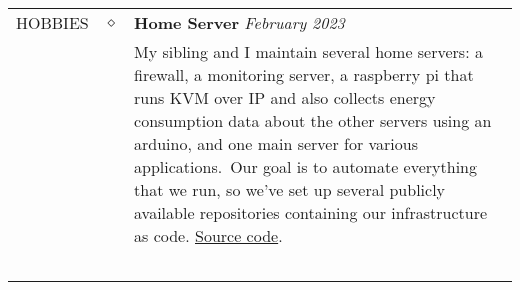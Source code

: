 \documentclass[11pt]{article}
\begin{document}
\begin{tabularx}{\textwidth}{@{}b{90px} b{9px}@{} X@{}}
        \lettrine[lines=1,loversize=-0.5]{H}OBBIES & $\diamond$ &

        \textbf{Home Server} \hfill \textit{February 2023} \\ & &
        My sibling and I maintain several home servers: a firewall, a monitoring server, a raspberry pi that runs KVM
        over IP and also collects energy consumption data about the other servers using an arduino, and one main server
        for various applications.\ Our goal is to automate everything that we run, so we've set up several publicly
        available repositories containing our infrastructure as code.
        \href{https://github.com/xserv-labs}{\color{blue} Source code}.\

        \iftoggle{lines}{\\ \\ \hline \\}{\\ \\}

    \end{tabularx}
\end{document}
